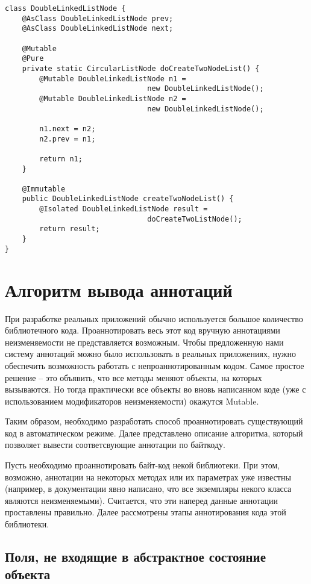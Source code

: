 \begin{lstlisting}[caption=DoubleLinkedListNode.java, label=code:circular_list_node_isolated]
class DoubleLinkedListNode {
    @AsClass DoubleLinkedListNode prev;
    @AsClass DoubleLinkedListNode next;
    
    @Mutable
    @Pure
    private static CircularListNode doCreateTwoNodeList() {
    	@Mutable DoubleLinkedListNode n1 = 
                                 new DoubleLinkedListNode();
        @Mutable DoubleLinkedListNode n2 = 
                                 new DoubleLinkedListNode();
    	
        n1.next = n2;
        n2.prev = n1;
    
        return n1;  
    }
    
    @Immutable
    public DoubleLinkedListNode createTwoNodeList() {
        @Isolated DoubleLinkedListNode result = 
                                 doCreateTwoListNode();
        return result;
    }
}
\end{lstlisting} 

\section{Алгоритм вывода аннотаций}

При разработке реальных приложений обычно используется большое количество библиотечного кода. Проаннотировать весь этот код вручную аннотациями неизменяемости не представляется возможным. Чтобы предложенную нами систему аннотаций можно было использовать в реальных приложениях, нужно обеспечить возможность работать с непроаннотированным кодом. Самое простое решение -- это объявить, что все методы меняют объекты, на которых вызываются. Но тогда практически все объекты во вновь написанном коде (уже с использованием модификаторов неизменяемости) окажутся Mutable. 

Таким образом, необходимо разработать способ проаннотировать существующий код в автоматическом режиме. Далее представлено описание алгоритма, который позволяет вывести соответсвующие аннотации по байткоду. 

Пусть необходимо проаннотировать байт-код некой библиотеки. При этом, возможно, аннотации на некоторых методах или их параметрах уже известны (например, в документации явно написано, что все экземпляры некого класса являются неизменяемыми). Считается, что эти наперед данные аннотации проставлены правильно. Далее рассмотрены этапы аннотирования кода этой библиотеки.

\subsection{Поля, не входящие в абстрактное состояние объекта}

